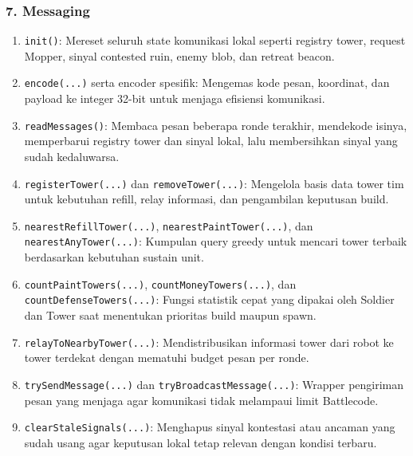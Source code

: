 \subsubsection{7. Messaging}
\begin{enumerate}
	\item \texttt{init()}:
	      Mereset seluruh state komunikasi lokal seperti registry tower, request Mopper, sinyal contested ruin, enemy blob, dan retreat beacon.

	\item \texttt{encode(...)} serta encoder spesifik:
	      Mengemas kode pesan, koordinat, dan payload ke integer 32-bit untuk menjaga efisiensi komunikasi.

	\item \texttt{readMessages()}:
	      Membaca pesan beberapa ronde terakhir, mendekode isinya, memperbarui registry tower dan sinyal lokal, lalu membersihkan sinyal yang sudah kedaluwarsa.

	\item \texttt{registerTower(...)} dan \texttt{removeTower(...)}:
	      Mengelola basis data tower tim untuk kebutuhan refill, relay informasi, dan pengambilan keputusan build.

	\item \texttt{nearestRefillTower(...)}, \texttt{nearestPaintTower(...)}, dan \texttt{nearestAnyTower(...)}:
	      Kumpulan query greedy untuk mencari tower terbaik berdasarkan kebutuhan sustain unit.

	\item \texttt{countPaintTowers(...)}, \texttt{countMoneyTowers(...)}, dan \texttt{countDefenseTowers(...)}:
	      Fungsi statistik cepat yang dipakai oleh Soldier dan Tower saat menentukan prioritas build maupun spawn.

	\item \texttt{relayToNearbyTower(...)}:
	      Mendistribusikan informasi tower dari robot ke tower terdekat dengan mematuhi budget pesan per ronde.

	\item \texttt{trySendMessage(...)} dan \texttt{tryBroadcastMessage(...)}:
	      Wrapper pengiriman pesan yang menjaga agar komunikasi tidak melampaui limit Battlecode.

	\item \texttt{clearStaleSignals(...)}:
	      Menghapus sinyal kontestasi atau ancaman yang sudah usang agar keputusan lokal tetap relevan dengan kondisi terbaru.
\end{enumerate}


